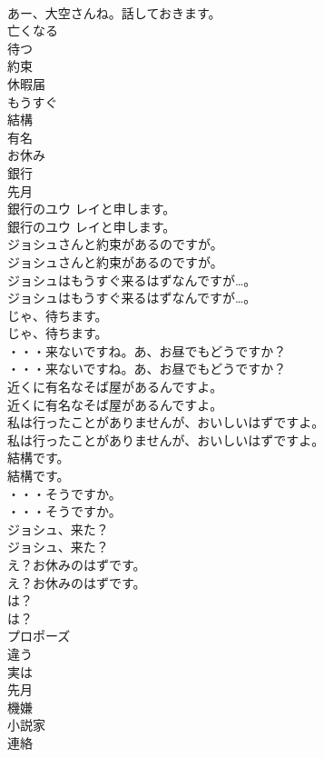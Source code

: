 \documentclass[8pt]{extreport}
\begin{document}
\begin{CJK}{UTF8}{min}
\\	あー、大空さんね。話しておきます。 
\\	亡くなる
\\	待つ
\\	約束
\\	休暇届
\\	もうすぐ
\\	結構
\\	有名
\\	お休み
\\	銀行
\\	先月
\\	銀行のユウ レイと申します。	
\\	銀行のユウ レイと申します。 
\\	ジョシュさんと約束があるのですが。	
\\	ジョシュさんと約束があるのですが。 
\\	ジョシュはもうすぐ来るはずなんですが…。	
\\	ジョシュはもうすぐ来るはずなんですが…。 
\\	じゃ、待ちます。	
\\	じゃ、待ちます。 
\\	・・・来ないですね。あ、お昼でもどうですか？	
\\	・・・来ないですね。あ、お昼でもどうですか？ 
\\	近くに有名なそば屋があるんですよ。	
\\	近くに有名なそば屋があるんですよ。 
\\	私は行ったことがありませんが、おいしいはずですよ。	
\\	私は行ったことがありませんが、おいしいはずですよ。 
\\	結構です。	
\\	結構です。 
\\	・・・そうですか。	
\\	・・・そうですか。 
\\	ジョシュ、来た？	
\\	ジョシュ、来た？ 
\\	え？お休みのはずです。	
\\	え？お休みのはずです。 
\\	は？	
\\	は？ 
\\	プロポーズ
\\	違う
\\	実は
\\	先月
\\	機嫌
\\	小説家
\\	連絡

\end{CJK}
\end{document}
